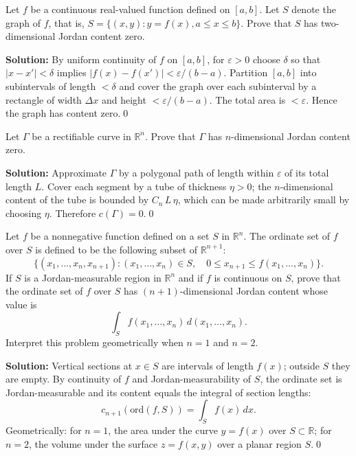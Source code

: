 \begin{problembox}
Let \( f \) be a continuous real-valued function defined on \([a, b]\). Let \( S \) denote the graph of \( f \), that is, \( S = \{(x, y) : y = f(x), a \leq x \leq b\} \). Prove that \( S \) has two-dimensional Jordan content zero.
\end{problembox}

\bigskip\noindent\textbf{Solution:}
By uniform continuity of $f$ on $[a,b]$, for $\varepsilon>0$ choose $\delta$ so that $|x-x'|<\delta$ implies $|f(x)-f(x')|<\varepsilon/(b-a)$. Partition $[a,b]$ into subintervals of length $<\delta$ and cover the graph over each subinterval by a rectangle of width $\Delta x$ and height $<\varepsilon/(b-a)$. The total area is $<\varepsilon$. Hence the graph has content zero.\qed


\begin{problembox}
Let \( \Gamma \) be a rectifiable curve in \( \mathbb{R}^n \). Prove that \( \Gamma \) has \( n \)-dimensional Jordan content zero.
\end{problembox}

\bigskip\noindent\textbf{Solution:}
Approximate $\Gamma$ by a polygonal path of length within $\varepsilon$ of its total length $L$. Cover each segment by a tube of thickness $\eta>0$; the $n$-dimensional content of the tube is bounded by $C_n\,L\,\eta$, which can be made arbitrarily small by choosing $\eta$. Therefore $c(\Gamma)=0$.\qed


\begin{problembox}
Let \( f \) be a nonnegative function defined on a set \( S \) in \( \mathbb{R}^n \). The ordinate set of \( f \) over \( S \) is defined to be the following subset of \( \mathbb{R}^{n+1} \):
\[\{(x_1, \ldots, x_n, x_{n+1}) : (x_1, \ldots, x_n) \in S, \quad 0 \leq x_{n+1} \leq f(x_1, \ldots, x_n)\}.\]
If \( S \) is a Jordan-measurable region in \( \mathbb{R}^n \) and if \( f \) is continuous on \( S \), prove that the ordinate set of \( f \) over \( S \) has \( (n + 1) \)-dimensional Jordan content whose value is
\[\int_{S} f(x_1, \ldots, x_n) \, d(x_1, \ldots, x_n).\]
Interpret this problem geometrically when \( n = 1 \) and \( n = 2 \).
\end{problembox}

\bigskip\noindent\textbf{Solution:}
Vertical sections at $x\in S$ are intervals of length $f(x)$; outside $S$ they are empty. By continuity of $f$ and Jordan-measurability of $S$, the ordinate set is Jordan-measurable and its content equals the integral of section lengths:
\[ c_{n+1}(\text{ord}(f,S)) = \int_S f(x)\,dx. \]
Geometrically: for $n=1$, the area under the curve $y=f(x)$ over $S\subset\mathbb R$; for $n=2$, the volume under the surface $z=f(x,y)$ over a planar region $S$.\qed
